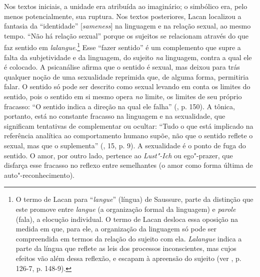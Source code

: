 Nos textos iniciais, a unidade era atribuída ao imaginário; o simbólico
era, pelo menos potencialmente, sua ruptura. Nos textos posteriores,
Lacan localizou a fantasia da ``identidade'' {[}\emph{sameness}{]} na
linguagem e na relação sexual, ao mesmo tempo. ``Não há relação sexual''
porque os sujeitos se relacionam através do que faz sentido em
\emph{lalangue}.\footnote{O termo de Lacan para ``\emph{langue}''
  (língua) de Saussure, parte da distinção que este promove entre
  \emph{langue} (a organização formal da linguagem) e \emph{parole}
  (fala), a elocução individual. O termo de Lacan desloca essa oposição
  na medida em que, para ele, a organização da linguagem só pode ser
  compreendida em termos da relação do sujeito com ela. \emph{Lalangue}
  indica a parte da língua que reflete as leis dos processos
  inconscientes, mas cujos efeitos vão além dessa reflexão, e escapam à
  apreensão do sujeito (ver , p. 126-7, p. 148-9).} Esse ``fazer
sentido'' é um complemento que supre a falta da subjetividade e da
linguagem, do sujeito \emph{na} linguagem, contra a qual ele é colocado.
A psicanálise afirma que o sentido é sexual, mas deixou para trás
qualquer noção de uma sexualidade reprimida que, de alguma forma,
permitiria falar. O sentido só pode ser descrito como sexual levando em
conta os limites do sentido, pois o sentido em si mesmo opera \emph{no}
limite, os limites de seu próprio fracasso: ``O sentido indica a direção
na qual ele falha'' (, p. 150). A tônica, portanto, está no
constante fracasso na linguagem e na sexualidade, que significam
tentativas de complementar ou ocultar: ``Tudo o que está implicado na
referência analítica ao comportamento humano supõe, não que o sentido
reflete o sexual, mas que o suplementa'' (, 15, p. 9). A sexualidade
é o ponto de fuga do sentido. O amor, por outro lado, pertence ao
\emph{Lust"-Ich} ou ego"-prazer, que disfarça esse fracasso no reflexo
entre semelhantes (o amor como forma última de auto"-reconhecimento).

